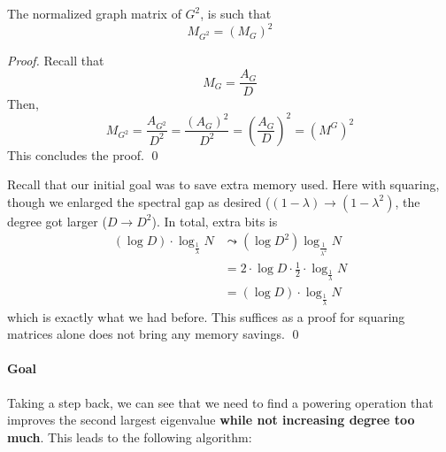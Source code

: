 \begin{proposition}
	The normalized graph matrix of $G^2$, is such that
	\begin{equation}
		M_{G^2} = \left ( M_G \right ) ^2
	\end{equation}
\end{proposition}

\begin{proof}
	Recall that 
	\begin{equation}
		M_G = \frac{A_G}{D}
	\end{equation}
	Then, 
	\begin{equation}
		M_{G^2} = \frac{A_{G^2}}{D^2} = \frac{(A_G)^2}{D^2} = \left( \frac{A_G}{D} \right) ^2 = (M^G) ^2
	\end{equation}
	This concludes the proof. \qed
\end{proof}

\begin{proposition}
	Recall that our initial goal was to save extra memory used. Here with squaring, though we enlarged the spectral gap as desired ($(1 - \lambda) \rightarrow (1 - \lambda^2) $, the degree got larger ($D \rightarrow D^2$). In total, extra bits is
	\begin{align}
		\left ( \log D \right ) \cdot \log_{\frac{1}{\lambda}} N
		&\leadsto \left( \log D^2 \right) \log _{\frac{1}{\lambda^2}} N \\
		&= 2 \cdot \log D \cdot \frac{1}{2} \cdot \log _{\frac{1}{\lambda}} N \\
		&= \left ( \log D \right ) \cdot \log_{\frac{1}{\lambda}} N
	\end{align}
	which is exactly what we had before. This suffices as a proof for squaring matrices alone does not bring any memory savings. \qed
\end{proposition}

\paragraph{Goal} Taking a step back, we can see that we need to find a powering operation that improves the second largest eigenvalue \textbf{while not increasing degree too much}. This leads to the following algorithm:

